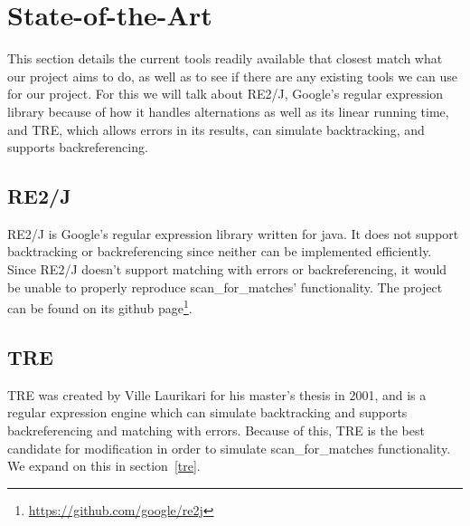 \section{State-of-the-Art}
This section details the current tools readily available that closest match 
what our project aims to do, as well as to see if there are any existing tools 
we can use for our project. For this we will talk about RE2/J, Google's regular 
expression library because of how it handles alternations as well as its 
linear running time, and TRE, which allows errors in its results, can 
simulate backtracking, and supports backreferencing.
 \subsection{RE2/J} %
 RE2/J is Google's regular expression library written for java. It does not support 
 backtracking or backreferencing since neither can be implemented 
 efficiently. Since RE2/J doesn't support matching with 
 errors or backreferencing, it would be unable to properly reproduce 
 scan\_for\_matches' functionality. The project can be found on its github 
 page\footnote{\url{https://github.com/google/re2j}}.
 \subsection{TRE} %
 TRE was created by Ville Laurikari for his master's thesis in 2001, and 
 is a regular expression engine which can simulate backtracking and supports 
 backreferencing and matching with errors. Because of this, TRE is the best 
 candidate for modification in order to simulate scan\_for\_matches functionality. 
 We expand on this in section~\ref{tre}.
